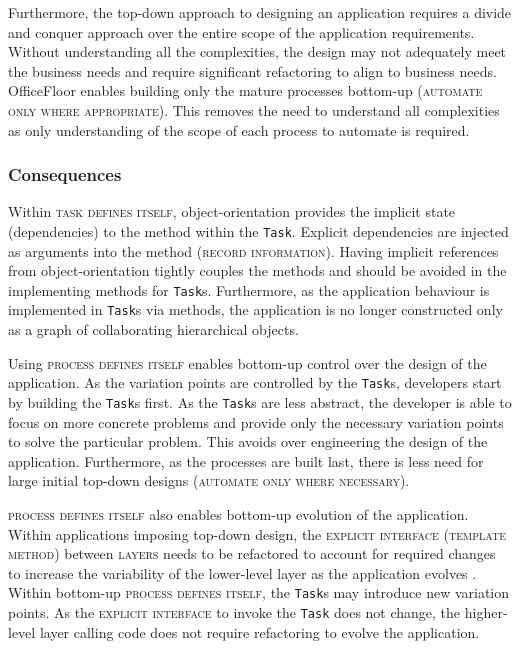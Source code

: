 \documentclass[prodmode]{style/acmlarge}
\begin{document}
Furthermore, the top-down approach to designing an application requires a divide
and conquer approach over the entire scope of the application requirements.
Without understanding all the complexities, the design may not adequately meet
the business needs and require significant refactoring to align to business
needs.  OfficeFloor enables building only the mature processes bottom-up
(\textsc{automate only where appropriate}).  This removes the need to understand
all complexities as only understanding of the scope of each process to automate
is required.


\subsubsection*{Consequences}

Within \textsc{task defines itself}, object-orientation provides the implicit
state (dependencies) to the method within the \texttt{Task}.  Explicit
dependencies are injected as arguments into the method (\textsc{record
information}).  Having implicit references from object-orientation tightly
couples the methods and should be avoided in the implementing methods for
\texttt{Task}s.  Furthermore, as the application behaviour is implemented in
\texttt{Task}s via methods, the application is no longer constructed only as a
graph of collaborating hierarchical objects.

Using \textsc{process defines itself} enables bottom-up control over the design
of the application.  As the variation points are controlled by the
\texttt{Task}s, developers start by building the \texttt{Task}s first.  As
the \texttt{Task}s are less abstract, the developer is able to focus on more
concrete problems and provide only the necessary variation points to solve the
particular problem.  This avoids over engineering the design of the application.
 Furthermore, as the processes are built last, there is less need for large
initial top-down designs (\textsc{automate only where necessary}).

\textsc{process defines itself} also enables bottom-up evolution of the
application.  Within applications imposing top-down design, the
\textsc{explicit interface} (\textsc{template method}) between \textsc{layers}
needs to be refactored to account for required changes to increase the
variability of the lower-level layer as the application evolves \cite{ioc}.
Within bottom-up \textsc{process defines itself}, the \texttt{Task}s may
introduce new variation points.  As the \textsc{explicit interface} to invoke
the \texttt{Task} does not change, the higher-level layer calling code does not
require refactoring to evolve the application.
\end{document}
